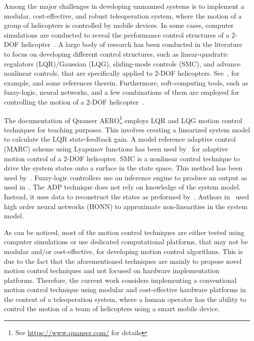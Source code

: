 Among the major challenges in developing unmanned systems is to implement a modular, cost-effective, and robust teleoperation system, where the motion of a group of helicopters is controlled by mobile devices. In some cases, computer simulations are conducted to reveal the performance control structures of a 2-DOF helicopter~\cite{DArpino2010}. A large body of research has been conducted in the literature to focus on developing different control structures, such as linear-quadratic regulators (LQR)/Gaussian (LQG), sliding-mode controls (SMC), and advance nonlinear controls, that are specifically applied to 2-DOF helicopters. See~\cite{Subramanian2016-Robust,Ahmed2010-Sliding}, for example, and some references therein. Furthermore,  soft-computing tools, such as fuzzy-logic, neural networks, and a few combinations of them are employed for controlling the motion of a 2-DOF helicopter~\cite{Chang2017-Fuzzy,Kayacan2016-Fuzzy,Gao2016-DataDriven,Hernandez2012-Decentralized}.

The documentation of Quanser AERO\footnote{See \href{https://www.quanser.com/}{https://www.quanser.com/} for details} employs LQR and LQG motion control techniques for teaching purposes.  This involves creating a linearized system model to calculate the LQR state-feedback gain.  A model reference adaptive control (MARC) scheme using Lyapunov functions has been used by~\cite{Subramanian2016-Robust} for adaptive motion control of a 2-DOF helicopter.  SMC is a nonlinear control technique to drive the system states onto a surface in the state space.  This method has been used  by~\cite{Ahmed2010-Sliding}.  Fuzzy-logic controllers use an inference engine to produce an output as used in~\cite{Chang2017-Fuzzy,Kayacan2016-Fuzzy}.  The ADP technique does not rely on knowledge of the system model.  Instead, it uses data to reconstruct the states as preformed by~\cite{Gao2016-DataDriven}.  Authors in~\cite{Hernandez2012-Decentralized} used high order neural networks (HONN) to approximate non-linearities in the system model.

As can be noticed, most of the motion control techniques are either tested using computer simulations or use dedicated computational platforms, that may not be modular and/or cost-effective, for developing motion control algorithms. This is due to the fact that the aforementioned techniques are mainly to propose novel motion control techniques and not focused on hardware implementation platforms. Therefore, the current work considers implementing a conventional motion control technique using modular and cost-effective hardware platforms in the context of a teleoperation system, where a human operator has the ability to control the motion of a team of helicopters using a smart mobile device.


